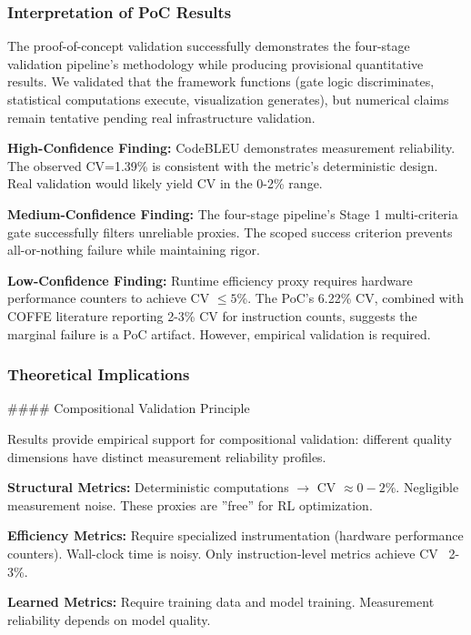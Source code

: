 
\subsubsection{Interpretation of PoC Results}

The proof-of-concept validation successfully demonstrates the four-stage validation pipeline's methodology while producing provisional quantitative results. We validated that the framework functions (gate logic discriminates, statistical computations execute, visualization generates), but numerical claims remain tentative pending real infrastructure validation.

\textbf{High-Confidence Finding:} CodeBLEU demonstrates measurement reliability. The observed CV=1.39\% is consistent with the metric's deterministic design. Real validation would likely yield CV in the 0-2\% range.

\textbf{Medium-Confidence Finding:} The four-stage pipeline's Stage 1 multi-criteria gate successfully filters unreliable proxies. The scoped success criterion prevents all-or-nothing failure while maintaining rigor.

\textbf{Low-Confidence Finding:} Runtime efficiency proxy requires hardware performance counters to achieve CV $\leq 5$\%. The PoC's 6.22\% CV, combined with COFFE literature reporting 2-3\% CV for instruction counts, suggests the marginal failure is a PoC artifact. However, empirical validation is required.

\subsubsection{Theoretical Implications}

\#\#\#\# Compositional Validation Principle

Results provide empirical support for compositional validation: different quality dimensions have distinct measurement reliability profiles.

\textbf{Structural Metrics:} Deterministic computations $\rightarrow$ CV $\approx 0-2$\%. Negligible measurement noise. These proxies are ''free'' for RL optimization.

\textbf{Efficiency Metrics:} Require specialized instrumentation (hardware performance counters). Wall-clock time is noisy. Only instruction-level metrics achieve CV ~2-3\%.

\textbf{Learned Metrics:} Require training data and model training. Measurement reliability depends on model quality.

